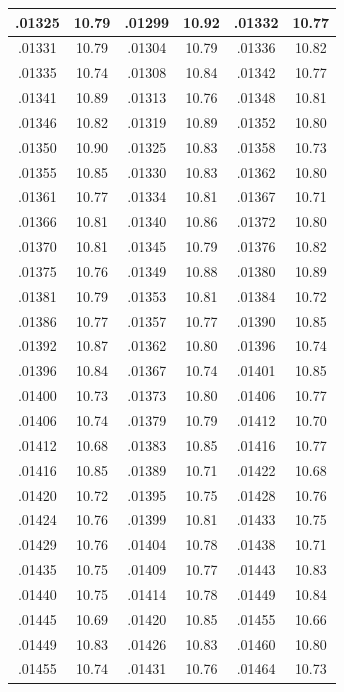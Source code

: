 \documentclass[11pt]{report}
\begin{document}
\begin{appendices}
\begin{longtable}{|c|c||c|c||c|c|}
.01325 & 10.79 & .01299 & 10.92 & .01332 & 10.77\\\hline
.01331 & 10.79 & .01304 & 10.79 & .01336 & 10.82\\\hline
.01335 & 10.74 & .01308 & 10.84 & .01342 & 10.77\\\hline
.01341 & 10.89 & .01313 & 10.76 & .01348 & 10.81\\\hline
.01346 & 10.82 & .01319 & 10.89 & .01352 & 10.80\\\hline
.01350 & 10.90 & .01325 & 10.83 & .01358 & 10.73\\\hline
.01355 & 10.85 & .01330 & 10.83 & .01362 & 10.80\\\hline
.01361 & 10.77 & .01334 & 10.81 & .01367 & 10.71\\\hline
.01366 & 10.81 & .01340 & 10.86 & .01372 & 10.80\\\hline
.01370 & 10.81 & .01345 & 10.79 & .01376 & 10.82\\\hline
.01375 & 10.76 & .01349 & 10.88 & .01380 & 10.89\\\hline
.01381 & 10.79 & .01353 & 10.81 & .01384 & 10.72\\\hline
.01386 & 10.77 & .01357 & 10.77 & .01390 & 10.85\\\hline
.01392 & 10.87 & .01362 & 10.80 & .01396 & 10.74\\\hline
.01396 & 10.84 & .01367 & 10.74 & .01401 & 10.85\\\hline
.01400 & 10.73 & .01373 & 10.80 & .01406 & 10.77\\\hline
.01406 & 10.74 & .01379 & 10.79 & .01412 & 10.70\\\hline
.01412 & 10.68 & .01383 & 10.85 & .01416 & 10.77\\\hline
.01416 & 10.85 & .01389 & 10.71 & .01422 & 10.68\\\hline
.01420 & 10.72 & .01395 & 10.75 & .01428 & 10.76\\\hline
.01424 & 10.76 & .01399 & 10.81 & .01433 & 10.75\\\hline
.01429 & 10.76 & .01404 & 10.78 & .01438 & 10.71\\\hline
.01435 & 10.75 & .01409 & 10.77 & .01443 & 10.83\\\hline
.01440 & 10.75 & .01414 & 10.78 & .01449 & 10.84\\\hline
.01445 & 10.69 & .01420 & 10.85 & .01455 & 10.66\\\hline
.01449 & 10.83 & .01426 & 10.83 & .01460 & 10.80\\\hline
.01455 & 10.74 & .01431 & 10.76 & .01464 & 10.73\\\hline

\end{longtable}
\end{appendices}
\end{document}
